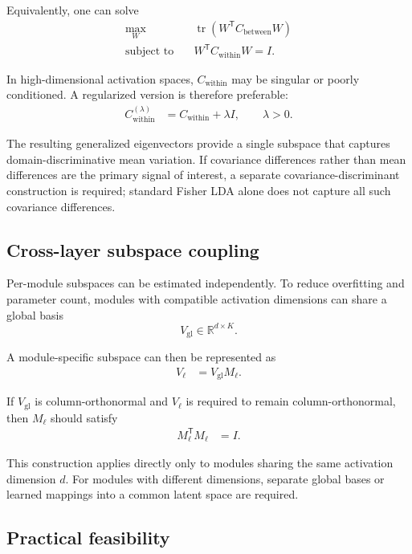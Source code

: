 \documentclass[11pt,a4paper]{article}
\DeclareMathOperator{\tr}{tr}
\begin{document}
Equivalently, one can solve
\begin{align}
\max_{W}
\quad
&\tr(W^{\mathsf T}C_{\mathrm{between}}W)
\\
\text{subject to}
\quad
&W^{\mathsf T}C_{\mathrm{within}}W=I.
\end{align}

In high-dimensional activation spaces, $C_{\mathrm{within}}$ may be
singular or poorly conditioned. A regularized version is therefore
preferable:
\begin{align}
C_{\mathrm{within}}^{(\lambda)}
&=
C_{\mathrm{within}}+\lambda I,
\qquad
\lambda>0.
\end{align}

The resulting generalized eigenvectors provide a single subspace that
captures domain-discriminative mean variation. If covariance
differences rather than mean differences are the primary signal of
interest, a separate covariance-discriminant construction is required;
standard Fisher LDA alone does not capture all such covariance
differences.

\subsection{Cross-layer subspace coupling}

Per-module subspaces can be estimated independently. To reduce
overfitting and parameter count, modules with compatible activation
dimensions can share a global basis
\[
V_{\mathrm{gl}}\in\mathbb{R}^{d\times K}.
\]

A module-specific subspace can then be represented as
\begin{align}
V_\ell
&=
V_{\mathrm{gl}}M_\ell.
\end{align}

If $V_{\mathrm{gl}}$ is column-orthonormal and $V_\ell$ is required to
remain column-orthonormal, then $M_\ell$ should satisfy
\begin{align}
M_\ell^{\mathsf T}M_\ell
&=
I.
\end{align}

This construction applies directly only to modules sharing the same
activation dimension $d$. For modules with different dimensions,
separate global bases or learned mappings into a common latent space
are required.

\subsection{Practical feasibility}
\end{document}
